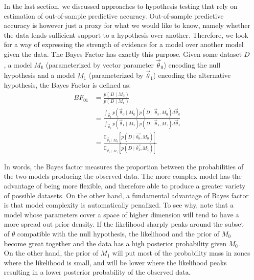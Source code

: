 \documentclass[a4paper,12pt,twoside]{article}
\begin{document}
In the last section, we discussed approaches to hypothesis testing that rely on estimation of out-of-sample predictive accuracy. Out-of-sample predictive accuracy is however just a proxy for what we would like to know, namely whether the data lends sufficient support to a hypothesis over another. Therefore, we look for a way of expressing the strength of evidence for a model over another model given the data. The Bayes Factor has exactly this purpose. Given some dataset $D$, a model $M_0$ (parameterized by vector parameter $\vec{\theta}_0$) encoding the null hypothesis and a model $M_1$ (parameterized by $\vec{\theta}_1$) encoding the alternative hypothesis, the Bayes Factor is defined as:
%
\begin{align}
BF_{01} & = \frac{p(D \mid M_0)}{p(D \mid M_1)} \\
& = \frac{\int_{\vec{\theta}_0} p(\vec{\theta}_0 \mid M_0) p(D \mid \vec{\theta}_0, M_0) d\vec{\theta}_0}{\int_{\vec{\theta}_1} p(\vec{\theta}_1 \mid M_1) p(D \mid \vec{\theta}_1, M_1) d \vec{\theta}_1} \\
& = \frac{\mathbb{E}_{\vec{\theta}_0 \mid M_0} [ p( D \mid \vec{\theta_0}, M_0  ) ]}{\mathbb{E}_{\vec{\theta}_1 \mid M_1} [ p( D \mid \vec{\theta_1}, M_1  ) ]} \label{eq:expecUnderPrior}
\end{align}

In words, the Bayes factor measures the proportion between the probabilities of the two models producing the observed data. The more complex model has the advantage of being more flexible, and therefore able to produce a greater variety of possible datasets. On the other hand, a fundamental advantage of Bayes factor is that model complexity is automatically penalized. To see why, note that a model whose parameters cover a space of higher dimension will tend to have a more spread out prior density. If the likelihood sharply peaks around the subset of $\theta$ compatible with the null hypothesis, the likelihood and the prior of $M_0$ become great together and the data has a high posterior probability given $M_0$. On the other hand, the prior of $M_1$ will put most of the probability mass in zones where the likelihood is small, and will be lower where the likelihood peaks resulting in a lower posterior probability of the observed data. 
\end{document}
